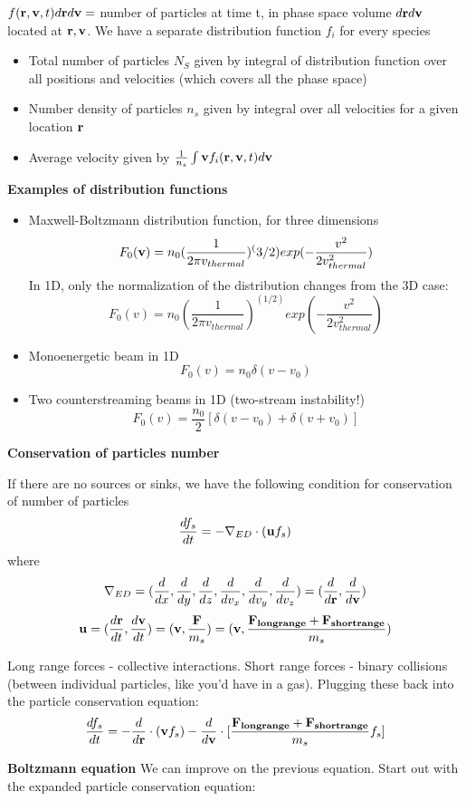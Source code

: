 $f(\mathbf{r}, \mathbf{v}, t) d\mathbf{r} d\mathbf{v} = $ number of particles at time t, in phase space volume $d\mathbf{r} d\mathbf{v}$ located at $\mathbf{r}, \mathbf{v}$. We have a separate distribution function $f_i$ for every species
\begin{itemize}
\item Total number of particles $N_S$ given by integral of distribution function over all positions and velocities (which covers all the phase space)
\item Number density of particles $n_s$ given by integral over all velocities for a given location $\mathbf{r}$ 
\item Average velocity given by $\frac{1}{n_s} \int \mathbf{v} f_i(\mathbf{r}, \mathbf{v}, t)  d\mathbf{v}$
\end{itemize}
\par \textbf{Examples of distribution functions}
\begin{itemize}
	\item Maxwell-Boltzmann distribution function, for three dimensions
	\[ F_0(\mathbf{v}) = n_0 (\frac{1}{2 \pi v_{thermal}})^(3/2) exp(-\frac{v^2}{2 v_{thermal}^2}) \] %
	In 1D, only the normalization of the distribution changes from the 3D case:
	\[ F_0(v) = n_0 (\frac{1}{2 \pi v_{thermal}})^(1/2) exp(-\frac{v^2}{2 v_{thermal}^2}) \]
	\item Monoenergetic beam in 1D
	\[ F_0(v) = n_0 \delta (v-v_0) \]
	\item Two counterstreaming beams in 1D (two-stream instability!)
	\[ F_0(v) = \frac{n_0}{2} [\delta (v-v_0) + \delta(v+v_0)] \]
\end{itemize}

\textbf{Conservation of particles number}

If there are no sources or sinks, we have the following condition for conservation of number of particles
\[ \frac{d f_s}{d t} = -\nabla_{ED} \cdot (\mathbf{u} f_s) \]
where
\[ \nabla_{ED} = ( \frac{d }{d x},\frac{d }{d y},\frac{d }{d z},\frac{d }{d v_x},\frac{d }{d v_y},\frac{d }{d v_z}) = (\frac{d }{d \mathbf{r}}, \frac{d }{d \mathbf{v}}) \]
\[ \mathbf{u} = (\frac{d \mathbf{r}}{d t}, \frac{d \mathbf{v}}{d t}) = (\mathbf{v}, \frac{\mathbf{F}}{m_s}) = (\mathbf{v}, \frac{\mathbf{F_{long range}} + \mathbf{F_{short range}}}{m_s}) \] %

Long range forces - collective interactions. Short range forces - binary collisions (between individual particles, like you'd have in a gas).
Plugging these back into the particle conservation equation:
\[ \frac{d f_s}{d t} = -\frac{d }{d \mathbf{r}} \cdot (\mathbf{v} f_s) - \frac{d }{d \mathbf{v}} \cdot [\frac{\mathbf{F_{long range}} + \mathbf{F_{short range}}}{m_s} f_s] \]

\textbf{Boltzmann equation}
	We can improve on the previous equation. Start out with the expanded particle conservation equation:
	
